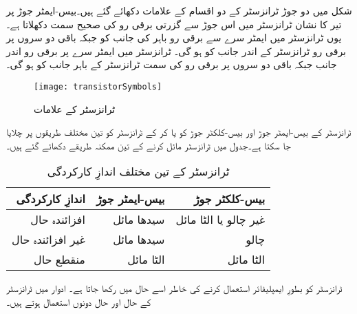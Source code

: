 شکل   میں دو جوڑ ٹرانزسٹر کے دو اقسام کے علامات دکھائے گئے ہیں۔بیس-ایمٹر  جوڑ پر تیر کا نشان ٹرانزسٹر میں اس جوڑ سے گزرتی برقی رو کی صحیح سمت دکھلاتا ہے۔یوں  ٹرانزسٹر میں ایمٹر سرے سے برقی رو  باہر کی جانب کو جبکہ باقی دو سروں پر برقی رو ٹرانزسٹر کے اندر جانب کو ہو گی۔ ٹرانزسٹر میں ایمٹر سرے پر برقی رو اندر جانب جبکہ  باقی دو سروں پر برقی رو کی سمت ٹرانزسٹر کے باہر جانب کو ہو گی۔
\begin{figure}
\centering
\texttt{[image: transistorSymbols]}
\caption{ٹرانزسٹر کے علامات}
\label{شکل_ٹرانزسٹر_کے_علامات}
\end{figure}
ٹرانزسٹر کے بیس-ایمٹر  جوڑ اور بیس-کلکٹر جوڑ کو  یا  کر کے ٹرانزسٹر کو تین مختلف طریقوں پر چلایا جا سکتا ہے۔جدول   میں ٹرانزسٹر مائل کرنے  کے تین ممکنہ طریقے دکھائے گئے ہیں۔
\begin{table}
\caption{ٹرانزسٹر کے تین مختلف اندازِ کارکردگی}
\label{جدول_ٹرانزسٹر_کے_تین_مختلف_انداز_کارکردگی}
\centering
\begin{tabular}{r r r}
\toprule
اندازِ کارکردگی & بیس-ایمٹر  جوڑ & بیس-کلکٹر جوڑ\\
\midrule

افزائندہ حال & سیدھا مائل & غیر چالو یا الٹا مائل\\
غیر افزائندہ حال& سیدھا مائل & چالو\\
منقطع حال & الٹا مائل & الٹا مائل \\
\bottomrule
\end{tabular}
\end{table}
ٹرانزسٹر کو بطورِ ایمپلیفائر استعمال کرنے کی خاطر اسے  حال    میں رکھا جاتا ہے۔ ادوار  میں ٹرانزسٹر کے  حال  اور   حال  دونوں استعمال ہوتے ہیں۔ 

